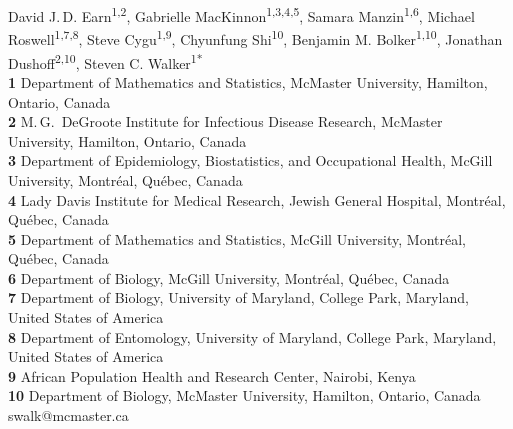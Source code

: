 
\vspace{1cm}

\newline
\\
\newline
\\

\vspace{0.5cm}

\noindent David J.\,D. Earn\textsuperscript{1,2},
Gabrielle MacKinnon\textsuperscript{1,3,4,5},
Samara Manzin\textsuperscript{1,6},
Michael Roswell\textsuperscript{1,7,8},
Steve Cygu\textsuperscript{1,9},
Chyunfung Shi\textsuperscript{10},
Benjamin M. Bolker\textsuperscript{1,10},
Jonathan Dushoff\textsuperscript{2,10},
Steven C. Walker\textsuperscript{1*}
\newline
\\
\textbf{1} Department of Mathematics and Statistics, McMaster University, Hamilton, Ontario, Canada
\\
\textbf{2} M.\,G.\ DeGroote Institute for Infectious Disease Research, McMaster University, Hamilton, Ontario, Canada
\\
\textbf{3} Department of Epidemiology, Biostatistics, and Occupational Health, McGill University, Montr\'{e}al, Qu\'{e}bec, Canada
\\
\textbf{4} Lady Davis Institute for Medical Research, Jewish General Hospital, Montr\'{e}al, Qu\'{e}bec, Canada
\\
\textbf{5} Department of Mathematics and Statistics, McGill University, Montr\'{e}al, Qu\'{e}bec, Canada
\\
\textbf{6} Department of Biology, McGill University, Montr\'{e}al, Qu\'{e}bec, Canada
\\
\textbf{7} Department of Biology, University of Maryland, College Park, Maryland, United States of America
\\
\textbf{8} Department of Entomology, University of Maryland, College Park, Maryland, United States of America
\\
\textbf{9} African Population Health and Research Center, Nairobi, Kenya
\\
\textbf{10} Department of Biology, McMaster University, Hamilton, Ontario, Canada
\\

\noindent * swalk@mcmaster.ca
